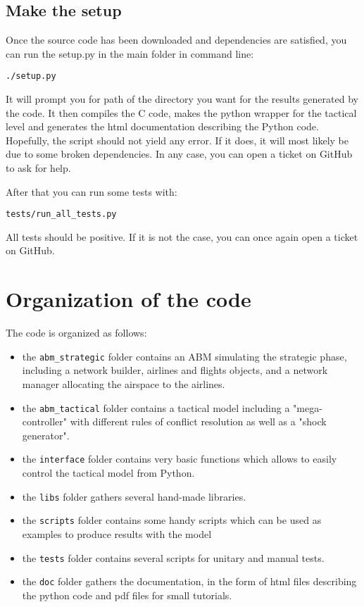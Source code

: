 \documentclass[12pt]{article}
\begin{document}
\subsection{Make the setup}

Once the source code has been downloaded and dependencies are satisfied, you can run the setup.py in the main folder in command line:

\begin{verbatim}
./setup.py
\end{verbatim}

It will prompt you for path of the directory you want for the results generated by the code. It then compiles the C code, makes the python wrapper for the tactical level and generates the html documentation describing the Python code. Hopefully, the script should not yield any error. If it does, it will most likely be due to some broken dependencies. In any case, you can open a ticket on GitHub to ask for help. 

After that you can run some tests with:
\begin{verbatim}
tests/run_all_tests.py
\end{verbatim}

All tests should be positive. If it is not the case, you can once again open a ticket on GitHub.

\section{Organization of the code}

The code is organized as follows:
\begin{itemize}
\item the \verb|abm_strategic| folder contains an ABM simulating the strategic phase, including a network builder, airlines and flights objects, and a network manager allocating the airspace to the airlines. 
\item the \verb|abm_tactical| folder contains a tactical model including a "mega-controller" with different rules of conflict resolution as well as a "shock generator".
\item the \verb|interface| folder contains very basic functions which allows to easily control the tactical model from Python.
\item the \verb|libs| folder gathers several hand-made libraries.
\item the \verb|scripts| folder contains some handy scripts which can be used as examples to produce results with the model
\item the \verb|tests| folder contains several scripts for unitary and manual tests. 
\item the \verb|doc| folder gathers the documentation, in the form of html files describing the python code and pdf files for small tutorials.
\end{itemize}          
\end{document}
